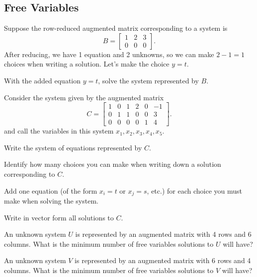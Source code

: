 \documentclass{problemset}
\begin{document}
\subsection*{Free Variables}
	\question
	Suppose the row-reduced augmented matrix corresponding to 
	a system is
	\[
		B=\left[\begin{array}{cc|c}
			1 & 2 & 3\\
			0 & 0 & 0
		\end{array}\right].
	\]
	After reducing, we have 1 equation and 2 unknowns, so we can make
	$2-1=1$ choices when writing a solution.  Let's make the
	choice $y=t$.
	
	\begin{parts}
		\item With the added equation $y=t$, solve the
		system represented by $B$.
	\end{parts}

	\question
	Consider the system given by the augmented matrix
	\[
		C=\left[\begin{array}{ccccc|c}
			1&0&1&2&0&-1\\
			0&1&1&0&0&3\\
			0&0&0&0&1&4
		\end{array}\right].
	\]
	and call the variables in this system $x_1,x_2,
	x_3,x_4,x_5$.

	\begin{parts}
		\item Write the system of equations represented by $C$.
		\item Identify how many choices you can make when writing
		down a solution corresponding to $C$.
		\item Add one equation (of the form $x_i=t$ or $x_j=s$, etc.)
		for each choice you must make when solving the system.
		\item Write in vector form all solutions to $C$.
	\end{parts}

	\question
	\begin{parts}
		\item An unknown system $U$ is represented by an augmented
		matrix with 4 rows and 6 columns.  What is 
		the minimum number of
		free variables solutions to $U$ will have?
		\item An unknown system $V$ is represented by an augmented
		matrix with 6 rows and 4 columns.  What is 
		the minimum number of
		free variables solutions to $V$ will have?
	\end{parts}
	
\end{document}
